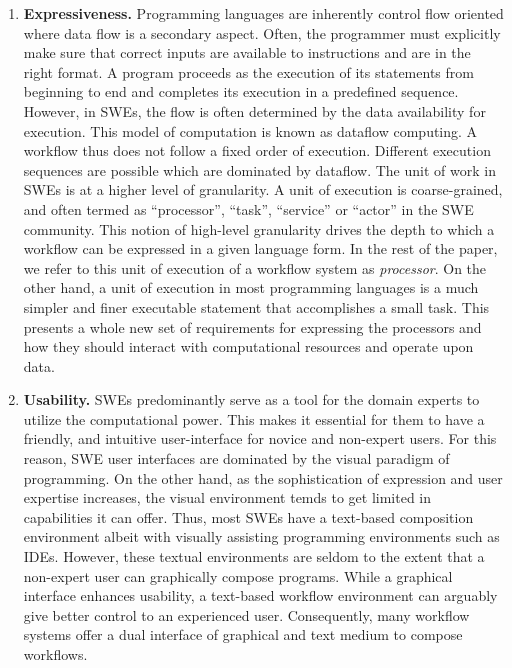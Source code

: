 \begin{enumerate}
\item \textbf{Expressiveness.} Programming languages are inherently control
flow oriented where data flow is a secondary aspect. Often, the
programmer must explicitly make sure that correct inputs are available
to instructions and are in the right format. A program proceeds as the
execution of its statements from beginning to end and completes its
execution in a predefined sequence. However, in SWEs, the flow is often
determined by the data availability for execution. This model of computation is
known as dataflow computing. A workflow thus does not follow a fixed order of
execution. Different execution sequences are possible which are dominated by
dataflow. The unit of work in SWEs is at a higher level of granularity. A unit
of execution is coarse-grained, and often termed as ``processor'', ``task'',
``service'' or ``actor'' in the SWE community. This notion of high-level
granularity drives the depth to which a workflow can be expressed in a given
language form. In the rest of the paper, we refer to this unit of execution of a
workflow system as \emph{processor}. On the other hand, a unit of execution in
most programming languages is a much simpler and finer executable statement
that accomplishes a small task. This presents a whole new set of
requirements for expressing the processors and how they should interact with
computational resources and operate upon data.

%
\item \textbf{Usability.} SWEs predominantly serve as a tool for the domain
experts to utilize the computational power. This makes it essential for
them to have a friendly, and intuitive user-interface for novice and
non-expert users. For this reason, SWE user interfaces are dominated by the
visual paradigm of programming. On the other hand, as the sophistication of
expression and user expertise increases, the visual environment temds to get
limited in capabilities it can offer. Thus, most SWEs have a text-based
composition environment albeit with visually assisting programming environments
such as IDEs. However, these textual environments are seldom to the extent that
a non-expert user can graphically compose programs. While a graphical interface
enhances usability, a text-based workflow environment can arguably give better
control to an experienced user. Consequently, many workflow systems offer a
dual interface of graphical and text medium to compose workflows.
    
\end{enumerate}

